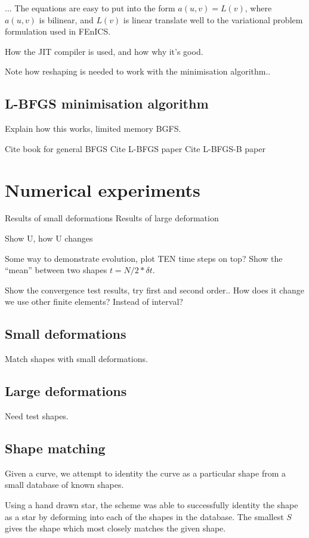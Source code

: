 \documentclass[a4paper, 10pt]{article}
\begin{document}
... The equations are easy to put into the form $a(u,v) = L(v)$, where $a(u,v)$ is bilinear, and $L(v)$ is linear translate well to the variational problem formulation used in FEnICS.

How the JIT compiler is used, and how why it's good.

Note how reshaping is needed to work with the minimisation algorithm..


\subsection{L-BFGS minimisation algorithm}


Explain how this works, limited memory BGFS. 

Cite book \cite{nocedal1999numerical} for general BFGS
Cite L-BFGS paper \cite{byrd1995limited}
Cite L-BFGS-B paper \cite{zhu1997algorithm}

\section{Numerical experiments}

Results of small deformations
Results of large deformation

Show U, how U changes

Some way to demonstrate evolution, plot TEN time steps on top?
Show the ``mean'' between two shapes $t = N/2*\delta t$.

Show the convergence test results, try first and second order..
How does it change we use other finite elements? Instead of interval?

\subsection{Small deformations}
  Match shapes with small deformations.


\subsection{Large deformations}
Need test shapes.

\subsection{Shape matching}

Given a curve, we attempt to identity the curve as a particular shape from a small database of known shapes. 

Using a hand drawn star, the scheme was able to successfully identity the shape as a star by deforming into each of the shapes in the database. The smallest $S$ gives the shape which most closely matches the given shape. 
\end{document}

